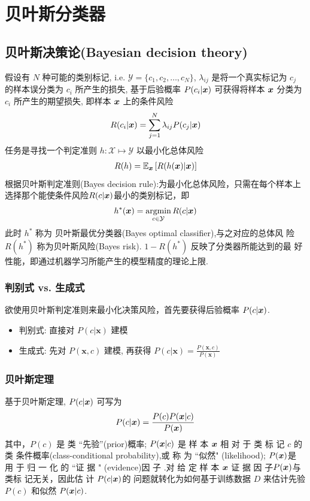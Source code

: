 \newpage
\section{贝叶斯分类器}
\subsection{贝叶斯决策论(Bayesian decision theory)}
假设有 $N$ 种可能的类别标记, i.e. $\mathcal{Y}=\{ c_1,c_2,\dots,c_N \}$, $\lambda_{ij}$ 是将一个真实标记为 $c_j$ 的样本误分类为 $c_i$ 所产生的损失, 基于后验概率 $P(c_i|\bm{x})$ 可获得将样本 $\bm{x}$ 分类为 $c_i$ 所产生的期望损失, 即样本 $\bm{x}$ 上的条件风险
\begin{align*}
    R(c_i|\bm{x})=\sum_{j=1}^N\lambda_{ij}P(c_j|\bm{x})
\end{align*}
任务是寻找一个判定准则 $h:\mathcal{X}\mapsto\mathcal{Y}$ 以最小化总体风险
\begin{align*}
    R(h)=\mathbb{E}_{\bm{x}}\left[ R(h(\bm{x})|\bm{x}) \right]
\end{align*}
根据贝叶斯判定准则(Bayes decision rule):为最小化总体风险，只需在每个样本上选择那个能使条件风险$R(c|\bm{x})$最小的类别标记，即
\begin{align*}
    h^*(\bm{x})=\operatorname*{argmin}_{c\in\mathcal{Y}}R(c|\bm{x})
\end{align*}
此时 $h^*$ 称为 贝叶斯最优分类器(Bayes optimal classifier),与之对应的总体风
险 $R(h^*)$ 称为贝叶斯风险(Bayes risk). $1-R(h^*)$ 反映了分类器所能达到的最
好性能，即通过机器学习所能产生的模型精度的理论上限.

\subsubsection{判别式 vs. 生成式}
欲使用贝叶斯判定准则来最小化决策风险，首先要获得后验概率 $P ( c | \bm{x})$. 
\begin{itemize}
    \item 判别式: 直接对 $P(c|\bm x)$ 建模
    \item 生成式: 先对 $P(\bm x,c)$ 建模, 再获得 $\displaystyle P(c|\bm x)=\frac{P(\bm x, c)}{P(\bm x)}$
\end{itemize}

\subsubsection{贝叶斯定理}
基于贝叶斯定理, $P(c|\bm{x})$ 可写为
\begin{align*}
    P(c|\bm{x})=\frac{P(c)P(\bm{x}|c)}{P(\bm{x})}
\end{align*}
其中，$P ( c )$ 是 类 “先验”(prior)概率;  $P ( \bm{x} | c )$ 是 样 本 $\bm{x}$ 相 对 于 类 标 记 $c$ 的类 条件概率(class-conditional probability),或 称 为 “似然" (likelihood); $P(\bm{x})$是 用 于 归 一 化 的 “证 据 " (evidence)因 子 .对 给 定 样 本 $\bm{x}$ 证 据 因 子$ P (\bm{x} ) $与类标 记无关，因此估 计 $P ( c |\bm{x}) $的 问题就转化为如何基于训练数据 $D$ 来估计先验 $P ( c )$ 和似然 $P (\bm{x} | c)$.
